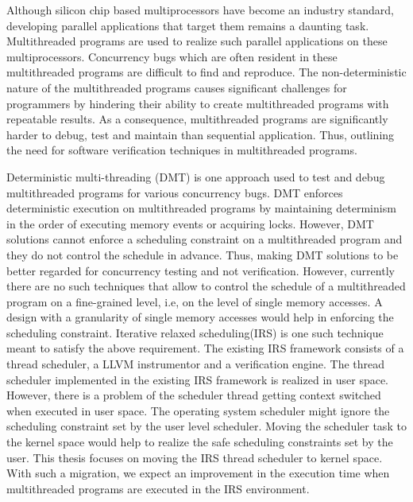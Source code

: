 Although silicon chip based multiprocessors have become an industry standard, developing parallel applications that target them remains a daunting task. 
Multithreaded programs are used to realize such parallel applications on these multiprocessors.
Concurrency bugs which are often resident in these multithreaded programs are difficult to find and reproduce.  
The non-deterministic nature of the multithreaded programs causes significant challenges for programmers by hindering their ability to create multithreaded programs with repeatable results. 
As a consequence, multithreaded programs are significantly harder to debug, test and maintain than sequential application. 
Thus, outlining the need for software verification techniques in multithreaded programs. 

Deterministic multi-threading (DMT) is one approach used to test and debug multithreaded programs for various concurrency bugs. 
DMT enforces deterministic execution on multithreaded programs by maintaining determinism in the order of executing memory events or acquiring locks. 
However, DMT solutions cannot enforce a scheduling constraint on a multithreaded program and they do not control the schedule in advance. 
Thus, making DMT solutions to be better regarded for concurrency testing and not verification. 
However, currently there are no such techniques that allow to control the schedule of a multithreaded program on a fine-grained level, i.e, on the level of single memory accesses. 
A design with a granularity of single memory accesses would help in enforcing the scheduling constraint. 
Iterative relaxed scheduling(IRS) is one such technique meant to satisfy the above requirement. 
The existing IRS framework consists of a thread scheduler, a LLVM instrumentor and a verification engine.  
The thread scheduler implemented in the existing IRS framework is realized in user space. 
However, there is a problem of the scheduler thread getting context switched when executed in user space. 
The operating system scheduler might ignore the scheduling constraint set by the user level scheduler. 
Moving the scheduler task to the kernel space would help to realize the safe scheduling constraints set by the user. 
This thesis focuses on moving the IRS thread scheduler to kernel space. 
With such a migration, we expect an improvement in the execution time when multithreaded programs are executed in the IRS environment.


